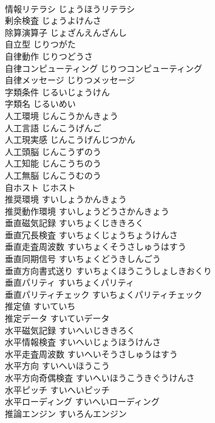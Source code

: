 \documentclass[8pt]{extreport}
\begin{document}
\begin{CJK}{UTF8}{min}
\\	情報リテラシ	じょうほうリテラシ	
\\	剰余検査	じょうよけんさ	
\\	除算演算子	じょざんえんざんし	
\\	自立型	じりつがた	
\\	自律動作	じりつどうさ	
\\	自律コンピューティング	じりつコンピューティング	
\\	自律メッセージ	じりつメッセージ	
\\	字類条件	じるいじょうけん	
\\	字類名	じるいめい	
\\	人工環境	じんこうかんきょう	
\\	人工言語	じんこうげんご	
\\	人工現実感	じんこうげんじつかん	
\\	人工頭脳	じんこうずのう	
\\	人工知能	じんこうちのう	
\\	人工無脳	じんこうむのう	
\\	自ホスト	じホスト	
\\	推奨環境	すいしょうかんきょう	
\\	推奨動作環境	すいしょうどうさかんきょう	
\\	垂直磁気記録	すいちょくじききろく	
\\	垂直冗長検査	すいちょくじょうちょうけんさ	
\\	垂直走査周波数	すいちょくそうさしゅうはすう	
\\	垂直同期信号	すいちょくどうきしんごう	
\\	垂直方向書式送り	すいちょくほうこうしょしきおくり	
\\	垂直パリティ	すいちょくパリティ	
\\	垂直パリティチェック	すいちょくパリティチェック	
\\	推定値	すいていち	
\\	推定データ	すいていデータ	
\\	水平磁気記録	すいへいじききろく	
\\	水平情報検査	すいへいじょうほうけんさ	
\\	水平走査周波数	すいへいそうさしゅうはすう	
\\	水平方向	すいへいほうこう	
\\	水平方向奇偶検査	すいへいほうこうきぐうけんさ	
\\	水平ピッチ	すいへいピッチ	
\\	水平ローディング	すいへいローディング	
\\	推論エンジン	すいろんエンジン	

\end{CJK}
\end{document}
